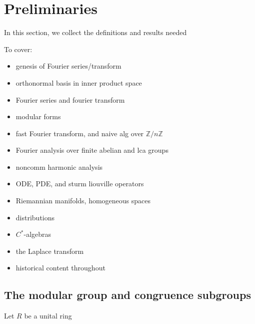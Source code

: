 \documentclass[10pt,leqno]{article}
\begin{document}
\newpage\section{Preliminaries} In this section, we collect the definitions and results needed

To cover: \begin{itemize}
    \item genesis of Fourier series/transform
    \item orthonormal basis in inner product space
    \item Fourier series and fourier transform
    \item modular forms
    \item fast Fourier transform, and naive alg over $\mathbb{Z}/n\mathbb{Z}$
    \item Fourier analysis over finite abelian and lca groups
    \item noncomm harmonic analysis
    \item ODE, PDE, and sturm liouville operators
    \item Riemannian manifolds, homogeneous spaces
    \item distributions
    \item $C^\ast$-algebras
    \item the Laplace transform
    \item historical content throughout
\end{itemize}\newpage %
\subsection{The modular group and congruence subgroups}
Let $R$ be a unital ring

\newpage\pagestyle{frontmatter}
\begin{bibdiv}
\begin{biblist}
\end{biblist}
\end{bibdiv}
\end{document}
